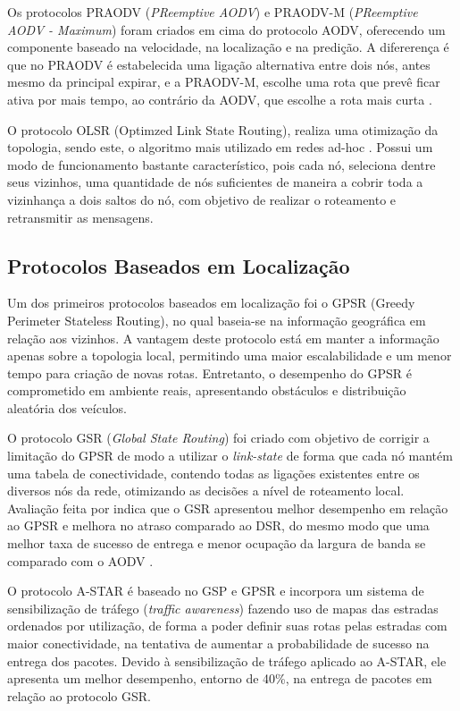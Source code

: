 \documentclass[
	12pt,				%
	oneside,			%
	a4paper,			%
	english,			%
	brazil				%
	]{abntex2ppgsi}
\begin{document}
Os protocolos PRAODV (\textit{PReemptive AODV}) e PRAODV-M (\textit{PReemptive AODV - Maximum}) foram criados em cima do protocolo AODV, oferecendo um componente baseado na velocidade, na localização  e na predição. A difererença é que no PRAODV é estabelecida uma ligação alternativa entre dois nós, antes mesmo da principal expirar, e a PRAODV-M, escolhe uma rota que prevê ficar ativa por mais tempo, ao contrário da AODV, que escolhe a rota mais curta \cite{luis2009melhoria}. 

O protocolo OLSR (Optimzed Link State Routing), realiza uma otimização da topologia, sendo este, o algoritmo mais utilizado em redes ad-hoc \cite{jacquet2001optimized}. Possui um modo de funcionamento bastante característico, pois cada nó, seleciona dentre seus vizinhos, uma quantidade de nós suficientes de maneira a cobrir toda a vizinhança a dois saltos do nó, com objetivo de realizar o roteamento e retransmitir as mensagens. 

\subsection{Protocolos Baseados em Localização}

Um dos primeiros protocolos baseados em localização foi o GPSR (Greedy Perimeter Stateless Routing), no qual baseia-se na informação geográfica em relação aos vizinhos. A vantagem deste protocolo está em manter a informação apenas sobre a topologia local, permitindo uma maior escalabilidade e um menor tempo para criação de novas rotas. Entretanto, o desempenho do GPSR é comprometido em ambiente reais, apresentando obstáculos e distribuição aleatória dos veículos.

O protocolo GSR (\textit{Global State Routing}) foi criado com objetivo de corrigir a limitação do GPSR de modo a utilizar o \textit{link-state} de forma que cada nó mantém uma tabela de conectividade, contendo todas as ligações existentes entre os diversos nós da rede, otimizando as decisões a nível de roteamento local. Avaliação feita por   indica que o GSR apresentou melhor desempenho em relação ao GPSR e melhora no atraso comparado ao DSR, do mesmo modo que uma melhor taxa de sucesso de entrega e menor ocupação da largura de banda se comparado com o AODV \cite{li2007routing}.  

O protocolo A-STAR é baseado no GSP e GPSR e incorpora um sistema de sensibilização de tráfego (\textit{traffic awareness}) fazendo uso de mapas das estradas ordenados por utilização, de forma a poder definir suas rotas pelas estradas com maior conectividade, na tentativa de aumentar a probabilidade de sucesso na entrega dos pacotes. Devido à sensibilização de tráfego aplicado ao A-STAR, ele apresenta um melhor desempenho, entorno de 40\%, na entrega de pacotes em relação ao protocolo GSR.
\end{document}
